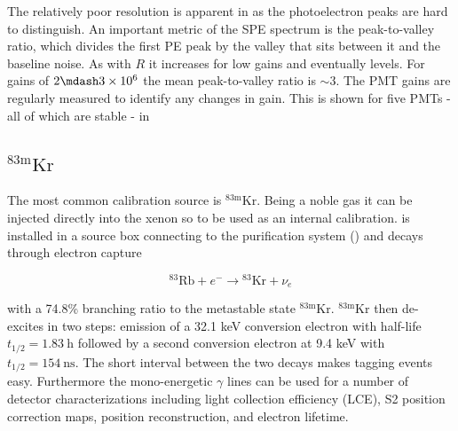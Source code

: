 {The relatively poor resolution is apparent in  as the photoelectron peaks are hard to distinguish.  An
important metric of the SPE spectrum is the peak-to-valley ratio, which divides the first PE peak by the valley that sits between it and
the baseline noise.  As with $R$ it increases for low gains and eventually levels.  For gains of $2 \mdash 3 \times 10^{6}$ the mean
peak-to-valley ratio is ${\sim} 3$.  The PMT gains are regularly measured to identify any changes in gain.  This is shown for five
PMTs - all of which are stable - in



\subsection{$\mathrm{^{83m}Kr}$}
\label{subsec:det_char_kr}
The most common calibration source is $\mathrm{^{83m}Kr}$.  Being a noble gas it can be injected directly into the xenon so to be used as an
internal calibration.   is installed in a source box connecting to the purification system
() and decays through electron capture

\begin{equation}
\mathrm{^{83}Rb} + e^- \rightarrow \mathrm{^{83}Kr} + \nu_e
\end{equation}

with a 74.8\% branching ratio to the metastable state $\mathrm{^{83m}Kr}$.  $\mathrm{^{83m}Kr}$ then de-excites in two steps: emission of a 32.1 keV
conversion electron with half-life $t_{1/2} = 1.83\ \mathrm{h}$ followed by a second conversion electron at 9.4 keV with
$t_{1/2} = 154\ \mathrm{ns}$.  The short
interval between the two decays makes tagging events easy.  Furthermore the mono-energetic $\gamma$ lines can be used for a number of
detector characterizations including light collection efficiency (LCE), S2 position correction maps, position reconstruction, and electron
lifetime.

}
